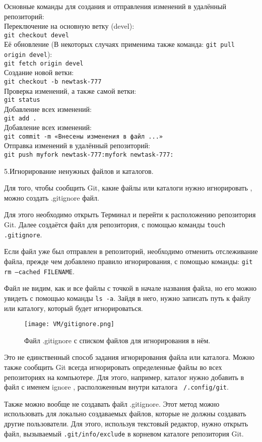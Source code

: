 Основные команды для создания и отправления изменений в удалённый репозиторий:
\\Переключение на основную ветку (devel):
\\ \texttt{git checkout devel}
\\ \quad Её обновление (В некоторых случаях применима также команда: \texttt{git pull origin devel}):
\\ \texttt{git fetch origin devel}
\\ \quad Создание новой ветки:
\\ \texttt{git checkout -b newtask-777}
\\ \quad Проверка изменений, а также самой ветки:
\\ \texttt{git status}
\\ \quad Добавление всех изменений:
\\ \texttt{git add .}
\\ \quad Добавление всех изменений:
\\ \texttt{git commit -m «Внесены изменения в файл ...»}
\\ \quad Отправка изменений в удалённый репозиторий:
\\ \texttt{git push myfork newtask-777:myfork newtask-777:}

5.\quad  Игнорирование ненужных файлов и каталогов.

Для того, чтобы сообщить Git, какие файлы или каталоги нужно игнорировать , можно создать .gitignore файл.

Для этого необходимо открыть Терминал и перейти к расположению репозитория Git. Далее создаётся файл для репозитория, с помощью команды \texttt{touch .gitignore}.

Если файл уже был отправлен в репозиторий, необходимо отменить отслеживание файла, прежде чем добавлено правило игнорирования, с помощью команды: \texttt{git rm --cached FILENAME}.

Файл не видим, как и все файлы с точкой в начале названия файла, но его можно увидеть с помощью команды \texttt{ls -a}. Зайдя в него, нужно записать путь к файлу или каталогу, который будет игнорироваться.

\begin{figure}[h]
		\centering
		\texttt{[image: VM/gitignore.png]}
\caption{Файл .gitignore с списком файлов для игнорирования в нём.}
\label{ris:image}
\end{figure}

Это не единственный способ задания игнорирования файла или каталога. Можно также сообщить Git всегда игнорировать определенные файлы во всех репозиториях на компьютере. Для этого, например, каталог нужно добавить в файл с именем ignore , расположенным внутри каталога \texttt{~/.config/git}.

Также можно вообще не создавать файл .gitignore. Этот метод можно использовать для локально создаваемых файлов, которые не должны создавать другие пользователи. Для этого, используя текстовый редактор, нужно открыть файл, вызываемый \texttt{.git/info/exclude} в корневом каталоге репозитория Git.